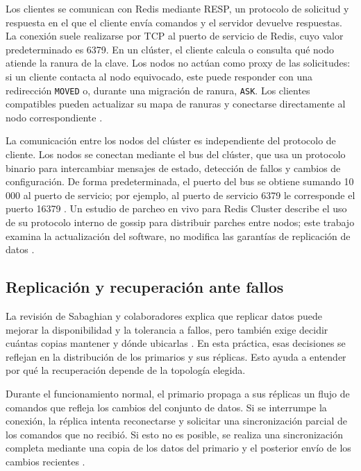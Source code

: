 \documentclass[12pt,a4paper]{article}
\begin{document}
Los clientes se comunican con Redis mediante RESP, un protocolo de solicitud y respuesta en el que el cliente envía comandos y el servidor devuelve respuestas. La conexión suele realizarse por TCP al puerto de servicio de Redis, cuyo valor predeterminado es 6379. En un clúster, el cliente calcula o consulta qué nodo atiende la ranura de la clave. Los nodos no actúan como proxy de las solicitudes: si un cliente contacta al nodo equivocado, este puede responder con una redirección \texttt{MOVED} o, durante una migración de ranura, \texttt{ASK}. Los clientes compatibles pueden actualizar su mapa de ranuras y conectarse directamente al nodo correspondiente \cite{redisResp,redisClusterSpec}.

La comunicación entre los nodos del clúster es independiente del protocolo de cliente. Los nodos se conectan mediante el bus del clúster, que usa un protocolo binario para intercambiar mensajes de estado, detección de fallos y cambios de configuración. De forma predeterminada, el puerto del bus se obtiene sumando 10\,000 al puerto de servicio; por ejemplo, al puerto de servicio 6379 le corresponde el puerto 16379 \cite{redisClusterScaling,redisClusterSpec}. Un estudio de parcheo en vivo para Redis Cluster describe el uso de su protocolo interno de gossip para distribuir parches entre nodos; este trabajo examina la actualización del software, no modifica las garantías de replicación de datos \cite{fruth2024livepatch}.

\subsection{Replicación y recuperación ante fallos}

La revisión de Sabaghian y colaboradores explica que replicar datos puede mejorar la disponibilidad y la tolerancia a fallos, pero también exige decidir cuántas copias mantener y dónde ubicarlas \cite{sabaghian2023replication}. En esta práctica, esas decisiones se reflejan en la distribución de los primarios y sus réplicas. Esto ayuda a entender por qué la recuperación depende de la topología elegida.

Durante el funcionamiento normal, el primario propaga a sus réplicas un flujo de comandos que refleja los cambios del conjunto de datos. Si se interrumpe la conexión, la réplica intenta reconectarse y solicitar una sincronización parcial de los comandos que no recibió. Si esto no es posible, se realiza una sincronización completa mediante una copia de los datos del primario y el posterior envío de los cambios recientes \cite{redisReplication}.
\end{document}
